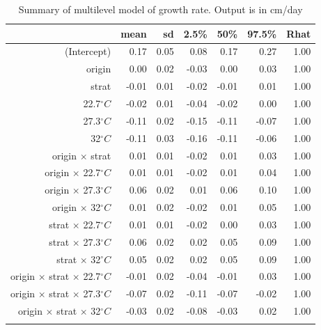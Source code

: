 \documentclass[12pt]{article}\usepackage[]{graphicx}\usepackage[]{color}
\begin{document}
\begin{longtable}{rrrrrrr}
\caption{Summary of multilevel model of growth rate.  Output is in cm/day} \\ 
  & mean & sd & 2.5\% & 50\% & 97.5\% & Rhat \\ 
  \hline
(Intercept) & 0.17 & 0.05 & 0.08 & 0.17 & 0.27 & 1.00 \\ 
  origin & 0.00 & 0.02 & -0.03 & 0.00 & 0.03 & 1.00 \\ 
  strat & -0.01 & 0.01 & -0.02 & -0.01 & 0.01 & 1.00 \\ 
  22.7$^\circ C$ & -0.02 & 0.01 & -0.04 & -0.02 & 0.00 & 1.00 \\ 
  27.3$^\circ C$ & -0.11 & 0.02 & -0.15 & -0.11 & -0.07 & 1.00 \\ 
  32$^\circ C$ & -0.11 & 0.03 & -0.16 & -0.11 & -0.06 & 1.00 \\ 
  origin $\times$ strat & 0.01 & 0.01 & -0.02 & 0.01 & 0.03 & 1.00 \\ 
  origin $\times$ 22.7$^\circ C$ & 0.01 & 0.01 & -0.02 & 0.01 & 0.04 & 1.00 \\ 
  origin $\times$ 27.3$^\circ C$ & 0.06 & 0.02 & 0.01 & 0.06 & 0.10 & 1.00 \\ 
  origin $\times$ 32$^\circ C$ & 0.01 & 0.02 & -0.02 & 0.01 & 0.05 & 1.00 \\ 
  strat $\times$ 22.7$^\circ C$ & 0.01 & 0.01 & -0.02 & 0.00 & 0.03 & 1.00 \\ 
  strat $\times$ 27.3$^\circ C$ & 0.06 & 0.02 & 0.02 & 0.05 & 0.09 & 1.00 \\ 
  strat $\times$ 32$^\circ C$ & 0.05 & 0.02 & 0.02 & 0.05 & 0.09 & 1.00 \\ 
  origin $\times$ strat $\times$ 22.7$^\circ C$ & -0.01 & 0.02 & -0.04 & -0.01 & 0.03 & 1.00 \\ 
  origin $\times$ strat $\times$ 27.3$^\circ C$ & -0.07 & 0.02 & -0.11 & -0.07 & -0.02 & 1.00 \\ 
  origin $\times$ strat $\times$ 32$^\circ C$ & -0.03 & 0.02 & -0.08 & -0.03 & 0.02 & 1.00 \\ 
  \hline
\label{tab:mod_gr}
\end{longtable}
\end{document}
